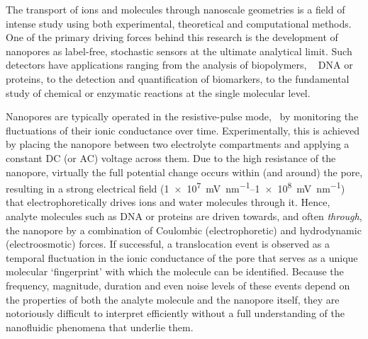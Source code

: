 \documentclass[journal=ancac3,manuscript=article,etalmode=truncate,maxauthors=0,layout=onecolumn]{achemso}
\begin{document}
The transport of ions and molecules through nanoscale geometries is a field of
intense study using both experimental, theoretical and computational
methods.\cite{Sparreboom-2010,Bocquet-2010,Maffeo-2012,
Thomas-2014,Wang-2014,Kim-2015} One of the primary driving forces behind this
research is the development of nanopores as label-free, stochastic sensors at
the ultimate analytical
limit.\cite{Bayley-2001,Dekker-2007,Venkatesan-2011,Zhang-2016} Such detectors
have applications ranging from the analysis of biopolymers, \ie{}~
DNA\cite{Deamer-2016,Kasianowicz-1996,Meller-2000,Maglia-2008,Butler-2008,Stoddart-2009,Franceschini-2013,Jain-2018}
or proteins,\cite{Restrepo-Perez-2018,Talaga-2009,Rodriguez-Larrea-2013,
Nivala-2013,Kennedy-2016} to the detection and quantification of
biomarkers,\cite{Chen-2013,Soskine-2012,
Niedzwiecki-2013,VanMeervelt-2014,Huang-2017,Liu-2018,Galenkamp-2018} to the
fundamental study of chemical or enzymatic reactions at the single molecular
level.\cite{Willems-VanMeervelt-2017,Lieberman-2010,
Nivala-2013,Ho-2015,Laszlo-2017}

Nanopores are typically operated in the resistive-pulse mode, \ie{}~by
monitoring the fluctuations of their ionic conductance over
time.\cite{Bayley-2001,Dekker-2007,Maglia-2010,Venkatesan-2011} Experimentally,
this is achieved by placing the nanopore between two electrolyte compartments
and applying a constant DC (or AC) voltage across them. Due to the high
resistance of the nanopore, virtually the full potential change occurs within
(and around) the pore, resulting in a strong electrical field
(\SIrange{1e7}{1e8}{\mV\per\nm}) that electrophoretically drives ions and water
molecules through it.\cite{Wong-2007,Mao-2014,Haywood-2014,Laohakunakorn-2015}
Hence, analyte molecules such as DNA or proteins are driven towards, and often
\emph{through}, the nanopore by a combination of Coulombic (electrophoretic) and
hydrodynamic (electroosmotic)
forces.\cite{Wong-2007,Grosberg-2010,Muthukumar-2010, Muthukumar-2014} If
successful, a translocation event is observed as a temporal fluctuation in the
ionic conductance of the pore that serves as a unique molecular `fingerprint'
with which the molecule can be identified.\cite{Yusko-2017} Because the
frequency, magnitude, duration and even noise levels of these events depend on
the properties of both the analyte molecule and the nanopore itself, they are
notoriously difficult to interpret efficiently without a full understanding of
the nanofluidic phenomena that underlie them.
\end{document}
